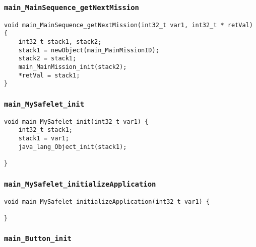 \begin{landscape}
\begin{multicols}{2}
\subsubsection{\texttt{main\_MainSequence\_getNextMission}}

\begin{lstlisting}[firstnumber=1847]
void main_MainSequence_getNextMission(int32_t var1, int32_t * retVal) {
	int32_t stack1, stack2;
	stack1 = newObject(main_MainMissionID);
	stack2 = stack1;
	main_MainMission_init(stack2);
	*retVal = stack1;
}
\end{lstlisting}

\subsubsection{\texttt{main\_MySafelet\_init}}

\begin{lstlisting}[firstnumber=1948]
void main_MySafelet_init(int32_t var1) {
	int32_t stack1;
	stack1 = var1;
	java_lang_Object_init(stack1);

}
\end{lstlisting}

\subsubsection{\texttt{main\_MySafelet\_initializeApplication}}

\begin{lstlisting}[firstnumber=2162]
void main_MySafelet_initializeApplication(int32_t var1) {
	
}
\end{lstlisting}

\subsubsection{\texttt{main\_Button\_init}}


\end{multicols}
\end{landscape}
